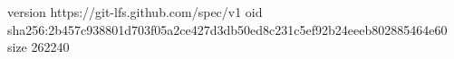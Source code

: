 version https://git-lfs.github.com/spec/v1
oid sha256:2b457c938801d703f05a2ce427d3db50ed8c231c5ef92b24eeeb802885464e60
size 262240
